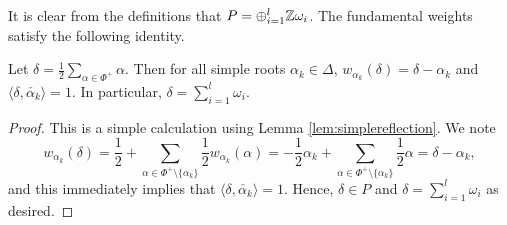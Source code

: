 It is clear from the definitions that $P=\oplus_{i=1}^l\mathbb{Z}\omega_i$. The fundamental weights satisfy the following identity.

\begin{lemma}
    Let $\delta=\frac{1}{2}\sum_{\alpha\in\Phi^+}\alpha$. Then for all simple roots $\alpha_k\in\Delta$, $w_{\alpha_k}(\delta)=\delta-\alpha_k$ and $\langle\delta,\check{\alpha_k}\rangle=1$. In particular, $\delta=\sum_{i=1}^{l}\omega_i$.
\end{lemma}
\begin{proof}
    This is a simple calculation using Lemma \ref{lem:simplereflection}. We note
    $$w_{\alpha_k}(\delta)=\frac{1}{2}+\sum_{\alpha\in\Phi^+\setminus\{\alpha_k\}}\frac{1}{2}w_{\alpha_k}(\alpha)=-\frac{1}{2}\alpha_k+\sum_{\alpha\in\Phi^+\setminus\{\alpha_k\}}\frac{1}{2}\alpha=\delta-\alpha_k,$$
    and this immediately implies that $\langle\delta,\check{\alpha_k}\rangle=1$. Hence, $\delta\in P$ and $\delta=\sum_{i=1}^{l}\omega_i$ as desired.
\end{proof}